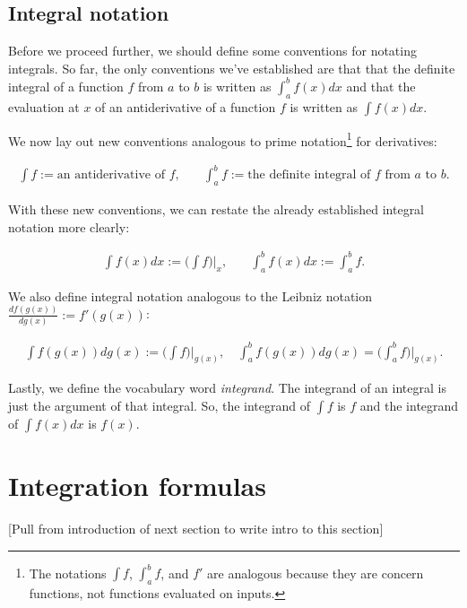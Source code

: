 \subsection*{Integral notation}

Before we proceed further, we should define some conventions for notating integrals. So far, the only conventions we've established are that that the definite integral of a function $f$ from $a$ to $b$ is written as $\int_a^b f(x) dx$ and that the evaluation at $x$ of an antiderivative of a function $f$ is written as $\int f(x) dx$. 

We now lay out new conventions analogous to prime notation\footnote{The notations $\int f$, $\int_a^b f$, and $f'$ are analogous because they are concern functions, not functions evaluated on inputs.} for derivatives:

\begin{align*}
    \int f := \text{an antiderivative of $f$}, &\quad \int_a^b f := \text{the definite integral of $f$ from $a$ to $b$}.
\end{align*}

With these new conventions, we can restate the already established integral notation more clearly:

\begin{align*}
    \int f(x) dx := \Big(\int f\Big)\Big|_x, &\quad \int_a^b f(x) dx := \int_a^b f.
\end{align*}

We also define integral notation analogous to the Leibniz notation $\frac{df(g(x))}{dg(x)} := f'(g(x))$:

\begin{align*}
    \int f(g(x)) dg(x) := \Big(\int f\Big)\Big|_{g(x)}, \quad \int_a^b f(g(x)) dg(x) = \Big(\int_a^b f\Big)\Big|_{g(x)}.
\end{align*}

\vspace{.5cm}

Lastly, we define the vocabulary word \textit{integrand}. The integrand of an integral is just the argument of that integral. So, the integrand of $\int f$ is $f$ and the integrand of $\int f(x) dx$ is $f(x)$.

\section*{Integration formulas}

[Pull from introduction of next section to write intro to this section]

